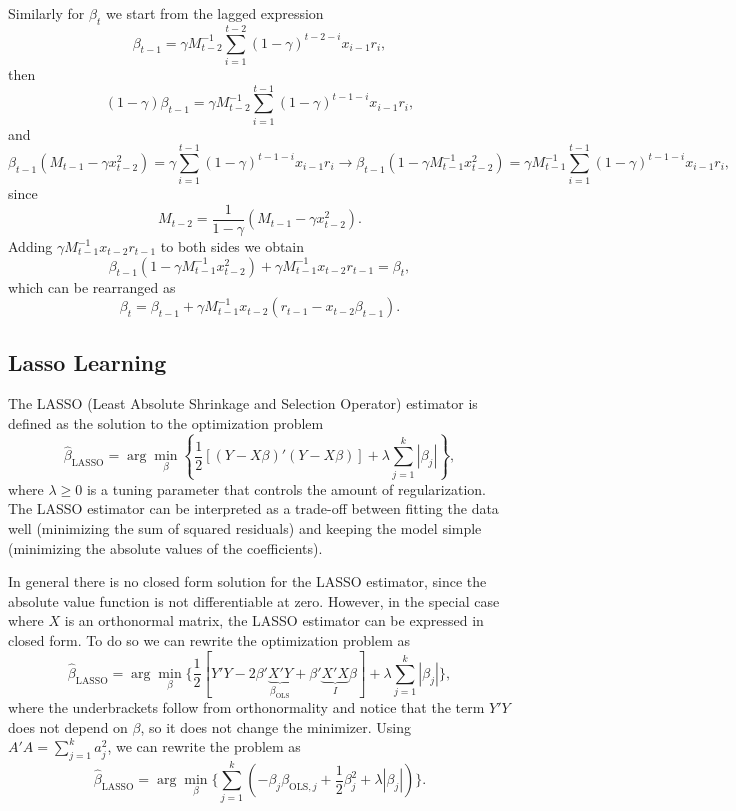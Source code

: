 Similarly for $\beta_t$ we start from the lagged expression
\begin{equation}
    \beta_{t-1} = \gamma M^{-1}_{t-2} \sum^{t-2}_{i=1} {(1 - \gamma)^{t-2-i}} x_{i-1} r_i,
\end{equation}
then
\begin{equation}
    (1- \gamma) \beta_{t-1} = \gamma M^{-1}_{t-2} \sum^{t-1}_{i=1} {(1 - \gamma)^{t-1-i}} x_{i-1} r_i ,
\end{equation}
and
\begin{equation}
 \beta_{t-1} ( M_{t-1} - \gamma x_{t-2}^2) =  \gamma \sum^{t-1}_{i=1} {(1 - \gamma)^{t-1-i}} x_{i-1} r_i \rightarrow \beta_{t-1} (1 - \gamma M^{-1}_{t-1} x_{t-2}^2) = \gamma M^{-1}_{t-1} \sum^{t-1}_{i=1} {(1 - \gamma)^{t-1-i}} x_{i-1} r_i,
\end{equation}
since \[M_{t-2} = \frac{1}{1 - \gamma} (M_{t-1} - \gamma x_{t-2}^2).\]
Adding $\gamma M^{-1}_{t-1} x_{t-2} r_{t-1}$ to both sides we obtain
\begin{equation}
    \beta_{t-1} (1 - \gamma M^{-1}_{t-1} x_{t-2}^2) + \gamma M^{-1}_{t-1} x_{t-2} r_{t-1} = \beta_t,
\end{equation}
which can be rearranged as
\begin{equation}
    \beta_t = \beta_{t-1} + \gamma M^{-1}_{t-1} x_{t-2} (r_{t-1} - x_{t-2} \beta_{t-1}).
\end{equation}

\subsection{Lasso Learning}\label{app:lasso}
The LASSO (Least Absolute Shrinkage and Selection Operator) estimator is defined as the solution to the optimization problem
\[
\hat{\beta}_{\text{LASSO}} = \arg\min_{\beta} \left\{\frac{1}{2}\left[(Y - X\beta)'(Y - X\beta)\right] + \lambda \sum_{j=1}^{k} |\beta_j|\right\},
\]
where $\lambda \geq 0$ is a tuning parameter that controls the amount of regularization. The LASSO estimator can be interpreted as a trade-off between fitting the data well (minimizing the sum of squared residuals) and keeping the model simple (minimizing the absolute values of the coefficients).

In general there is no closed form solution for the LASSO estimator, since the absolute value function is not differentiable at zero. However, in the special case where $X$ is an orthonormal matrix, the LASSO estimator can be expressed in closed form.
To do so we can rewrite the optimization problem as
\[
\hat{\beta}_{\text{LASSO}} 
= \arg\min_{\beta} 
\Big\{ \frac{1}{2}\left[Y'Y - 2\beta'\underbrace{X'Y}_{\beta_{\text{OLS}}} 
+ \beta'\underbrace{X'X}_{I}\beta\right]
+ \lambda \sum_{j=1}^{k} |\beta_j| \Big\},
\]
where the underbrackets follow from orthonormality and notice that the term $Y'Y$ does not depend on $\beta$, so it does not change the minimizer.
Using $A'A = \sum_{j=1}^{k} a_j^2$, we can rewrite the problem as
\[
\hat{\beta}_{\text{LASSO}} = \arg\min_{\beta} \Big\{ \sum_{j=1}^{k} \left( -\beta_j \beta_{\text{OLS},j} + \frac{1}{2}\beta_j^2 + \lambda |\beta_j| \right) \Big\}.
\]


